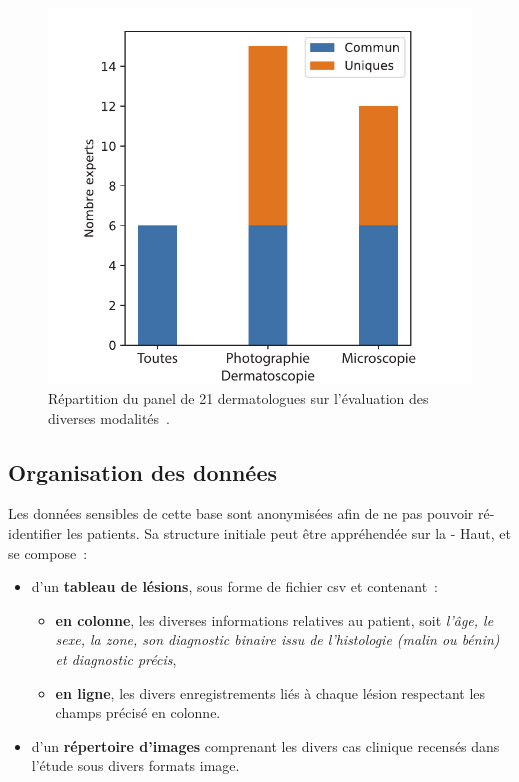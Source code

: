 \begin{figure}[H]
    \centering
    \includegraphics[width=0.75\linewidth]{contents/chapter_4/resources/experts_evaluation.pdf}
    \caption{Répartition du panel de 21 dermatologues sur l'évaluation des diverses modalités~\cite{Cinotti2018}.}
    \label{fig:experts_evaluation}
\end{figure}\par
\clearpage

\subsection{Organisation des données}
\label{sec:dataset_organisation}
Les données sensibles de cette base sont anonymisées afin de ne pas pouvoir ré-identifier les patients. Sa structure initiale peut être appréhendée sur la  - Haut, et se compose~:
\begin{itemize}
    \item d'un \textbf{tableau de lésions}, sous forme de fichier \gls{csv} et contenant~:
    \begin{itemize}
        \item \textbf{en colonne}, les diverses informations relatives au patient, soit \textit{l'âge, le sexe, la zone, son diagnostic binaire issu de l'histologie (malin ou bénin) et diagnostic précis},
        \item \textbf{en ligne}, les divers enregistrements liés à chaque lésion respectant les champs précisé en colonne.
    \end{itemize}
    \item d'un \textbf{répertoire d'images} comprenant les divers cas clinique recensés dans l'étude sous divers formats image.
\end{itemize}\par

